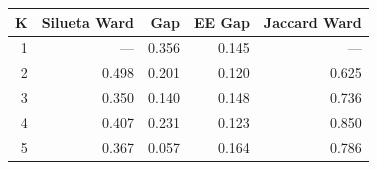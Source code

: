 \begin{tabular}{rrrrr}
\toprule
K & Silueta Ward & Gap & EE Gap & Jaccard Ward \\
\midrule
1 & --- & 0.356 & 0.145 & --- \\
2 & 0.498 & 0.201 & 0.120 & 0.625 \\
3 & 0.350 & 0.140 & 0.148 & 0.736 \\
4 & 0.407 & 0.231 & 0.123 & 0.850 \\
5 & 0.367 & 0.057 & 0.164 & 0.786 \\
\bottomrule
\end{tabular}
